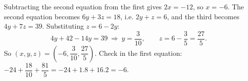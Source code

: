 Subtracting the second equation from the first gives $2x=-12$, so $x=-6$. The second equation becomes $6y+3z=18$, i.e. $2y+z=6$, and the third becomes $4y+7z=39$. Substituting $z=6-2y$:
\[4y+42-14y=39\ \Longrightarrow\ y=\dfrac{3}{10},\qquad z=6-\dfrac35=\dfrac{27}{5}.\]
So $\boxed{(x,y,z)=\left(-6,\dfrac3{10},\dfrac{27}5\right)}$. Check in the first equation: $-24+\dfrac{18}{10}+\dfrac{81}{5}=-24+1.8+16.2=-6$.
